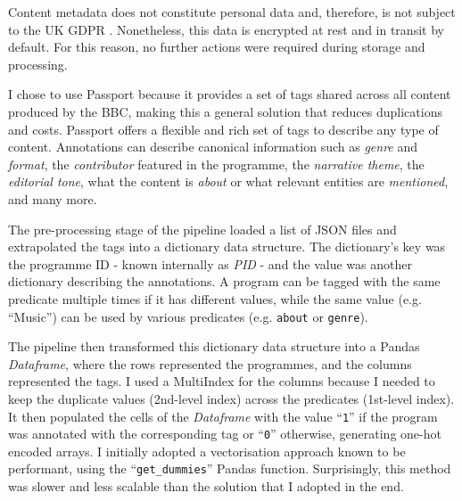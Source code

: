 
Content metadata does not constitute personal data and, therefore, is not subject to the UK GDPR  \cite{UKGDPR}.
Nonetheless, this data is encrypted at rest and in transit by default.
For this reason, no further actions were required during storage and processing.


I chose to use Passport because it provides a set of tags shared across all content produced by the BBC,
making this a general solution that reduces duplications and costs.
Passport offers a flexible and rich set of tags to describe any type of content.
Annotations can describe canonical information such as \textit{genre} and \textit{format},
the \textit{contributor} featured in the programme, the \textit{narrative theme}, the \textit{editorial tone},
what the content is \textit{about} or what relevant entities are \textit{mentioned}, and many more.


The pre-processing stage of the pipeline loaded a list of JSON files and extrapolated the tags into a dictionary data structure.
The dictionary's key was the programme ID - known internally as \textit{PID} - and the value was another dictionary describing the annotations.
A program can be tagged with the same predicate multiple times if it has different values,
while the same value (e.g. ``Music'') can be used by various predicates (e.g. \verb|about| or \verb|genre|).

The pipeline then transformed this dictionary data structure into a Pandas \textit{Dataframe},
where the rows represented the programmes, and the columns represented the tags.
I used a MultiIndex \cite{Pandas:MultiIndex} for the columns because I needed to keep the duplicate values (2nd-level index) across the predicates
(1st-level index).
It then populated the cells of the \textit{Dataframe} with the value ``\verb|1|''
if the program was annotated with the corresponding tag or ``\verb|0|'' otherwise, generating one-hot encoded arrays.
I initially adopted a vectorisation approach known to be performant, using the ``\verb|get_dummies|'' Pandas function.
Surprisingly, this method was slower and less scalable than the solution that I adopted in the end.

